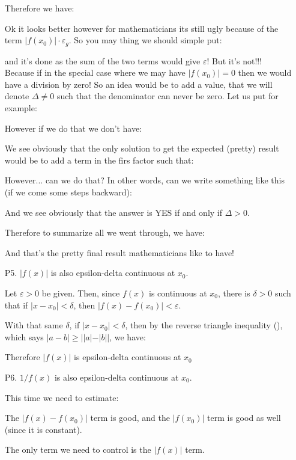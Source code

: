 \begin{enumerate}
		Therefore we have:
		
		Ok it looks better however for mathematicians its still ugly because of the term $|f(x_0)| \cdot \varepsilon_g$. So you may thing we should simple put:
		
		and it's done as the sum of the two terms would give $\varepsilon$! But it's not!!! Because if in the special case where we may have $|f(x_0)|=0$ then we would have a division by zero! So an idea would be to add a value, that we will denote $\Delta\neq 0$ such that the denominator can never be zero. Let us put for example:
		
		However if we do that we don't have:
		
		We see obviously that the only solution to get the expected (pretty) result would be to add a term in the firs factor such that:
		
		However... can we do that? In other words, can we write something like this (if we come some steps backward):
		
		And we see obviously that the answer is YES if and only if $\Delta>0$.
		
		Therefore to summarize all we went through, we have:
		
		And that's the pretty final result mathematicians like to have!
		
		\item[P5.] $|f(x)|$ is also epsilon-delta continuous at $x_0$.
		
		Let $\varepsilon>0$ be given. Then, since $f(x)$ is continuous at $x_0$, there is $\delta>0$ such that if $\left|x-x_0\right|<\delta$, then $\left|f(x)-f\left(x_0\right)\right|<\varepsilon$.
		
		With that same $\delta$, if $\left|x-x_0\right|<\delta$, then by the reverse triangle inequality (), which says $|a-b| \geq|| a|-| b||$, we have:
		
		Therefore $|f(x)|$ is epsilon-delta continuous at $x_0$
		
		\item[P6.] $1/f(x)$ is also epsilon-delta continuous at $x_0$.
		
		This time we need to estimate:
		
		The $\left|f(x)-f\left(x_0\right)\right|$ term is good, and the $\left|f\left(x_0\right)\right|$ term is good as well (since it is constant).
	
		The only term we need to control is the $|f(x)|$ term.
		

\end{enumerate}
